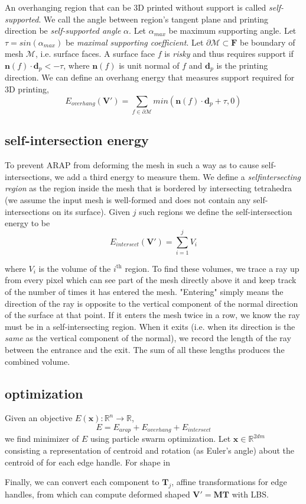 \documentclass[12pt]{article}
\newcommand{\R}{\mathbb{R}}
\newcommand{\calM}{\mathcal{M}}
\newcommand{\bV}{\mathbf{V}}
\newcommand{\bF}{\mathbf{F}}
\newcommand{\bM}{\mathbf{M}}
\newcommand{\bT}{\mathbf{T}}
\newcommand{\bn}{\mathbf{n}}
\newcommand{\bd}{\mathbf{d}}
\newcommand{\bx}{\mathbf{x}}
\begin{document}
An overhanging region that can be 3D printed without support is called \textit{self-supported}. We call the angle between region's tangent plane and printing direction be \textit{self-supported angle} $\alpha$. Let $\alpha_{max}$ be maximum supporting angle. Let $\tau = sin(\alpha_{max})$ be \textit{maximal supporting coefficient}. Let $\partial \calM \subset \bF$ be boundary of mesh $\calM$, i.e. surface faces. A surface face $f$ is \textit{risky} and thus requires support if $\bn(f) \cdot \bd_{p} < -\tau$, where $\bn(f)$ is unit normal of $f$ and $\bd_{p}$ is the printing direction. We can define an overhang energy that measures support required for 3D printing,
\[
    E_{overhang}(\bV') = \sum_{f\in \partial \calM} min(\bn(f) \cdot \bd_{p} + \tau, 0)
\]


\subsection*{self-intersection energy}

To prevent ARAP from deforming the mesh in such a way as to cause self-intersections, we add a third energy to measure them. We define a \textit{self\-intersecting region} as the region inside the mesh that is bordered by intersecting tetrahedra (we assume the input mesh is well-formed and does not contain any self-intersections on its surface). Given $j$ such regions we define the self-intersection energy to be
\[
	E_{intersect}(\bV') = \sum_{i=1}^j V_i
\]

where $V_i$ is the volume of the $i^{\text{th}}$ region. To find these volumes, we trace a ray up from every pixel which can see part of the mesh directly above it and keep track of the number of times it has entered the mesh. "Entering" simply means the direction of the ray is opposite to the vertical component of the normal direction of the surface at that point. If it enters the mesh twice in a row, we know the ray must be in a self-intersecting region. When it exits (i.e. when its direction is the \textit{same} as the vertical component of the normal), we record the length of the ray between the entrance and the exit. The sum of all these lengths produces the combined volume.


\subsection*{optimization}

Given an objective $E(\bx): \R^n \rightarrow \R$, 
\[
    E = E_{arap} + E_{overhang} + E_{intersect}
\]
we find minimizer of $E$ using particle swarm optimization. Let $\bx \in \R^{2dm}$ consisting a representation of centroid and rotation (as Euler's angle) about the centroid of for each edge handle. For shape in 

Finally, we can convert each component to $\bT_j$, affine transformations for edge handles, from which can compute deformed shaped $\bV' = \bM \bT$ with LBS.
\end{document}
